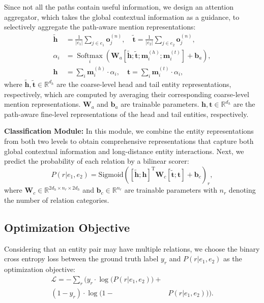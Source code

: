 \documentclass{article}
\begin{document}
Since not all the paths contain useful information, we design an attention aggregator, which takes the global contextual information as a guidance, to selectively aggregate the path-aware mention representations: 
\begin{align}
    \mathbf{\widetilde{h}} &= \frac{1}{\left|e_1\right|} \sum_{j \in e_1} {\mathbf{o}^{(n)}_{j}}, \quad
    \mathbf{\widetilde{t}} = \frac{1}{\left|e_2\right|} \sum_{j \in e_2} {\mathbf{o}^{(n)}_{j}},  \\
    \alpha_i &= \mathop{\text{Softmax}}\limits_{i} \left( \mathbf{W}_a [\mathbf{\widetilde{h}}; \mathbf{\widetilde{t}}; \mathbf{m}^{(h)}_{i}; \mathbf{m}^{(t)}_{i}] + \mathbf{b}_a \right), \\
    \mathbf{h} &= \sum_i {\mathbf{m}^{(h)}_{i} \cdot \alpha_i}, \quad
    \mathbf{t} = \sum_i {\mathbf{m}^{(t)}_{i} \cdot \alpha_i}, 
\end{align}
where $\mathbf{\widetilde{h}},\mathbf{\widetilde{t}} \in \mathbb{R}^{d_h}$ are the coarse-level head and tail entity representations, respectively, which are computed by averaging their corresponding coarse-level mention representations. 
$\mathbf{W}_a$ and $\mathbf{b}_a$ are trainable parameters. 
$\mathbf{h}, \mathbf{t} \in \mathbb{R}^{d_h}$ are the path-aware fine-level representations of the head and tail entities, respectively. 

\noindent\textbf{Classification Module:}
In this module, we combine the entity representations from both two levels to obtain comprehensive representations that capture both global contextual information and long-distance entity interactions. 
Next, we predict the probability of each relation by a bilinear scorer: 
\begin{equation}
    P(r|e_1, e_2) = \text{Sigmoid} \left( [\mathbf{\widetilde{h}}; \mathbf{h}]^{\text{T}} \mathbf{W}_c [\mathbf{\widetilde{t}}; \mathbf{t}] + \mathbf{b}_c \right)_r, 
\end{equation}
where $\mathbf{W}_c \in \mathbb{R}^{2d_h \times n_r \times 2d_h} $ and  $\mathbf{b}_c \in \mathbb{R}^{n_r}$ are trainable parameters with $n_r$ denoting the number of relation categories. 

\subsection{Optimization Objective}
Considering that an entity pair may have multiple relations, we choose the binary cross entropy loss between the ground truth label $y_r$ and $P(r|e_1, e_2)$ as the optimization objective: 
\begin{equation}
    \begin{aligned}
    \mathcal{L} = -\sum_r \Big( y_r \cdot \log \big(P(r|e_1, e_2)\big) + & \\
    (1 - y_r) \cdot \log \big(1 - & P(r|e_1, e_2)\big) \Big). 
    \end{aligned}
\end{equation}
\end{document}
